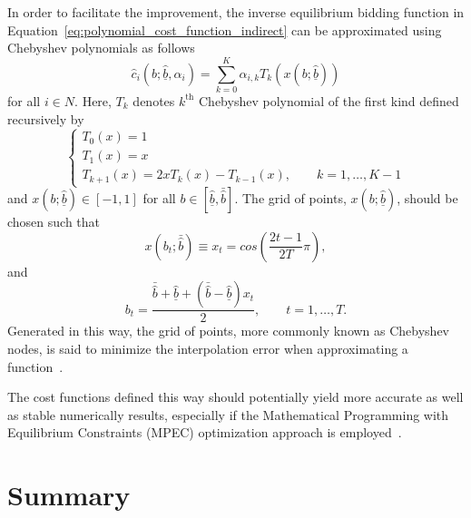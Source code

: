 In order to facilitate the improvement, the inverse equilibrium bidding function in Equation~\eqref{eq:polynomial_cost_function_indirect} can be approximated using Chebyshev polynomials as follows
\begin{equation*}
  \displaystyle\hat{c}_i(b;\underline{\hat{b}},\alpha_i) = \sum_{k=0}^K \alpha_{i,k} T_k\left(x(b;\underline{\hat{b}})\right)
\end{equation*}
for all $i\in N$. Here, $T_k$ denotes $k^{\textrm{th}}$ Chebyshev polynomial of the first kind defined recursively by
\begin{equation*}
  \left\{
    \begin{array}{l}
      T_0(x) = 1\\
      T_1(x) = x\\
      T_{k+1}(x) = 2xT_k(x) - T_{k-1}(x), \qquad k=1,\ldots,K-1
    \end{array}
  \right.
\end{equation*}
and $x(b;\underline{\hat{b}})\in [-1,1]$ for all $b\in [\underline{\hat{b}}, \bar{\hat{b}}]$. The grid of points, $x(b;\underline{\hat{b}})$, should be chosen such that
\begin{equation*}
  \displaystyle x(b_t;\bar{\hat{b}}) \equiv x_t = cos\left(\frac{2t-1}{2T}\pi\right),
\end{equation*}
and
\begin{equation*}
  b_t = \frac{\bar{\hat{b}} + \underline{\hat{b}} + (\bar{\hat{b}} - \underline{\hat{b}})x_t}{2}, \qquad t = 1,\ldots,T.
\end{equation*}
Generated in this way, the grid of points, more commonly known as Chebyshev nodes, is said to minimize the interpolation error when approximating a function~\cite{Hubbard2011}.

The cost functions defined this way should potentially yield more accurate as well as stable numerically results, especially if the Mathematical Programming with Equilibrium Constraints (MPEC) optimization approach is employed~\cite{HubbardPaarsch2011,Hubbard2011}.


\section{Summary}
\label{sec:summary_indirect}

